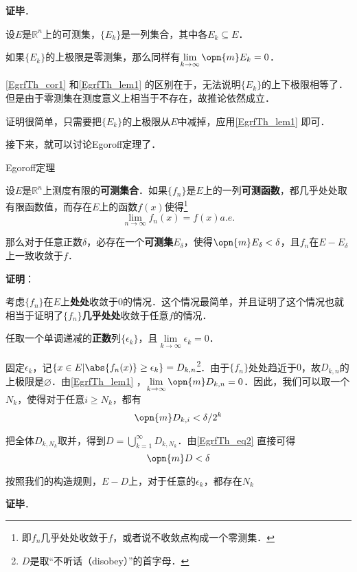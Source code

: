 \textbf{证毕}．

\begin{corollary}{}\label{EgrfTh_cor1}
设$E$是$\mathbb{R}^n$上的可测集，$\{E_k\}$是一列集合，其中各$E_k\subseteq E$．

如果$\{E_k\}$的上极限是零测集，那么同样有$\lim\limits_{k\to\infty}\opn{m}E_k=0$．
\end{corollary}

\autoref{EgrfTh_cor1} 和\autoref{EgrfTh_lem1} 的区别在于，无法说明$\{E_k\}$的上下极限相等了．但是由于零测集在测度意义上相当于不存在，故推论依然成立．

证明很简单，只需要把$\{E_k\}$的上极限从$E$中减掉，应用\autoref{EgrfTh_lem1} 即可．





接下来，就可以讨论Egoroff定理了．


\begin{theorem}{Egoroff定理}

设$E$是$\mathbb{R}^n$上测度有限的\textbf{可测集合}．如果$\{f_n\}$是$E$上的一列\textbf{可测函数}，都几乎处处取有限函数值，而存在$E$上的函数$f(x)$使得\footnote{即$f_n$几乎处处收敛于$f$，或者说不收敛点构成一个零测集．}\begin{equation}
\lim\limits_{n\to\infty}f_n(x)=f(x)a. e. 
\end{equation}

那么对于任意正数$\delta$，必存在一个\textbf{可测集}$E_\delta$，使得$\opn{m}E_\delta<\delta$，且$f_n$在$E-E_\delta$上一致收敛于$f$．

\end{theorem}

\textbf{证明}：

考虑$\{f_n\}$在$E$上\textbf{处处}收敛于$0$的情况．这个情况最简单，并且证明了这个情况也就相当于证明了$\{f_n\}$\textbf{几乎处处}收敛于任意$f$的情况．



任取一个单调递减的\textbf{正数}列$\{\epsilon_k\}$，且$\lim\limits_{k\to\infty}\epsilon_k=0$．

固定$\epsilon_k$，记$\{x\in E|\abs{f_n(x)}\geq\epsilon_k\}=D_{k, n}$\footnote{$D$是取“不听话（disobey）”的首字母．}．由于$\{f_n\}$处处趋近于$0$，故$D_{k, n}$的上极限是$\varnothing$．由\autoref{EgrfTh_lem1} ，$\lim\limits_{k\to\infty}\opn{m}D_{k, n}=0$．因此，我们可以取一个$N_k$，使得对于任意$i\geq N_k$，都有
\begin{equation}\label{EgrfTh_eq2}
\opn{m}D_{k, i}<\delta/2^k
\end{equation}

把全体$D_{k, N_k}$取并，得到$D=\bigcup_{k=1}^\infty D_{k, N_k}$．由\autoref{EgrfTh_eq2} 直接可得
\begin{equation}
\opn{m}D<\delta
\end{equation}

按照我们的构造规则，$E-D$上，对于任意的$\epsilon_k$，都存在$N_k$

\textbf{证毕}．










